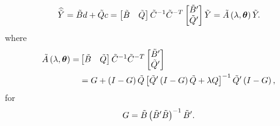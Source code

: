 \begin{equation} \label{eq:tildeY-hat-equals-tildeA-tildeY}
\widehat{\tilde{Y}} = \tilde{B} d + \tilde{Q} c = \begin{bmatrix} \tilde{B} & \tilde{Q} \end{bmatrix} \tilde{C}^{-1} \tilde{C}^{-T} \begin{bmatrix} \tilde{B}' \\ \tilde{Q}' \end{bmatrix} \tilde{Y} = \tilde{A}\left(\lambda, \mbox{\boldmath $\theta$}\right) \tilde{Y}.
\end{equation} 
\noindent
where
\begin{align}
\begin{split} \label{eq:cholesky-tildeA}
\tilde{A}\left(\lambda, \mbox{\boldmath $\theta$} \right) =& \begin{bmatrix} \tilde{B} & \tilde{Q} \end{bmatrix} \tilde{C}^{-1} \tilde{C}^{-T} \begin{bmatrix} \tilde{B}' \\ \tilde{Q}' \end{bmatrix}  \\
&= G + \left(I - G\right) \tilde{Q} \left[\tilde{Q}'\left( I - G \right)\tilde{Q} + \lambda Q\right]^{-1} \tilde{Q}'\left(I - G\right),
\end{split}
\end{align} 
\noindent
for
\[
G = \tilde{B}\left(\tilde{B}' \tilde{B} \right)^{-1}\tilde{B}'.
\]





